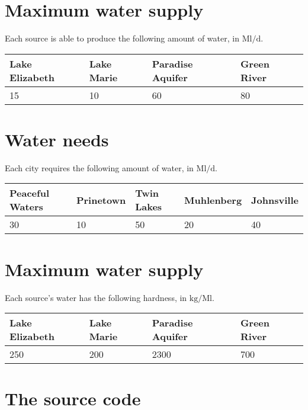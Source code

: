 \documentclass{article}
\begin{document}
\section{Maximum water supply} \label{max_water}

Each source is able to produce the following amount of water, in $\si{\mega\litre\per\day}$.

\begin{tabular}{| l l l l |}

\hline
Lake Elizabeth & Lake Marie & Paradise Aquifer & Green River \\ \hline
15 & 10 & 60 & 80 \\
\hline

\end{tabular}

\section{Water needs} \label{water_needs}

Each city requires the following amount of water, in $\si{\mega\litre\per\day}$.

\begin{tabular}{| l l l l l |}

\hline
Peaceful Waters & Prinetown & Twin Lakes & Muhlenberg & Johnsville \\ \hline
30 & 10 & 50 & 20 & 40\\
\hline

\end{tabular}

\section{Maximum water supply} \label{hardness}

Each source's water has the following hardness, in $\si{\kilo\gram\per\mega\litre}$.

\begin{tabular}{| l l l l |}

\hline
Lake Elizabeth & Lake Marie & Paradise Aquifer & Green River \\ \hline
250 & 200 & 2300 & 700 \\
\hline

\end{tabular}
	
\section{The source code} \label{src}
	
	
		
\end{document}
